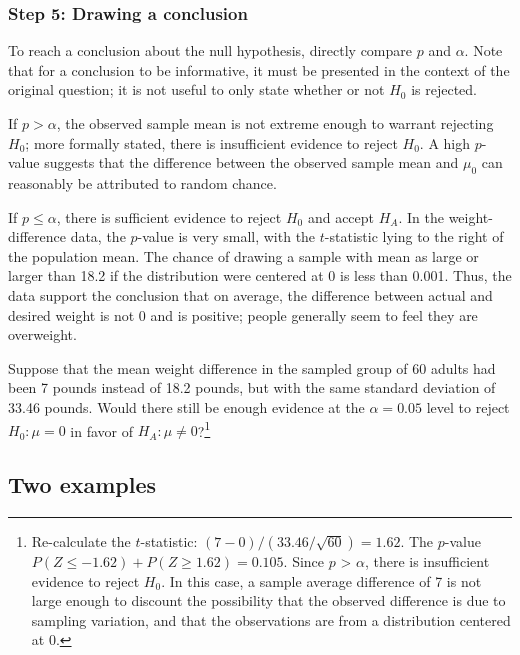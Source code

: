 \subsubsection{Step 5: Drawing a conclusion}

To reach a conclusion about the null hypothesis, directly compare $p$ and $\alpha$. Note that for a conclusion to be informative, it must be presented in the context of the original question; it is not useful to only state whether or not $H_0$ is rejected.

If $p > \alpha$, the observed sample mean is not extreme enough to warrant rejecting $H_0$; more formally stated, there is insufficient evidence to reject $H_0$. A high $p$-value suggests that the difference between the observed sample mean and $\mu_0$ can reasonably be attributed to random chance.

If $p \leq \alpha$, there is sufficient evidence to reject $H_0$ and accept $H_A$. In the  weight-difference data, the $p$-value is very small, with the $t$-statistic lying to the right of the population mean. The chance of drawing a sample with mean as large or larger than 18.2 if the distribution were centered at 0 is less than 0.001. Thus, the data support the conclusion that on average, the difference between actual and desired weight is  not 0 and is positive; people generally seem to feel they are overweight.

\begin{exercise}
  Suppose that the mean weight difference in the sampled group of 60 adults had been 7 pounds instead of 18.2 pounds, but with the same standard deviation of 33.46 pounds. Would there still be enough evidence at the $\alpha = 0.05$ level to reject $H_0: \mu = 0$ in favor of $H_A: \mu \neq 0$?\footnote{Re-calculate the $t$-statistic: $(7 - 0)/(33.46/\sqrt{60}) = 1.62$. The $p$-value $ P(Z \leq -1.62) + P(Z \geq 1.62) = 0.105$. Since $p$ > $\alpha$, there is insufficient evidence to reject $H_0$. In this case, a sample average difference of 7 is not large enough to discount the possibility that the observed difference is due to sampling variation, and that the observations are from a distribution centered at 0.}

\end{exercise}

\subsection{Two examples}


